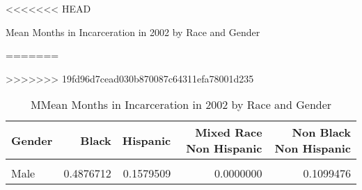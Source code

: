 \begin{table}[H]

<<<<<<< HEAD
\caption{\label{tab:tab:summarystats}Mean Months in Incarceration in 2002 by Race and Gender}
=======
\caption{\label{tab:tab:summarystats}MMean Months in Incarceration in 2002 by Race and Gender}
>>>>>>> 19fd96d7cead030b870087c64311efa78001d235
\centering
\begin{tabular}[t]{lrrrr}
\toprule
Gender & Black & Hispanic & Mixed Race Non Hispanic & Non Black Non Hispanic\\
\midrule
\cellcolor{gray!6}{Female} & \cellcolor{gray!6}{0.0211268} & \cellcolor{gray!6}{0.0298013} & \cellcolor{gray!6}{0.1428571} & \cellcolor{gray!6}{0.0193192}\\
Male & 0.4876712 & 0.1579509 & 0.0000000 & 0.1099476\\
\bottomrule
\end{tabular}
\end{table}
